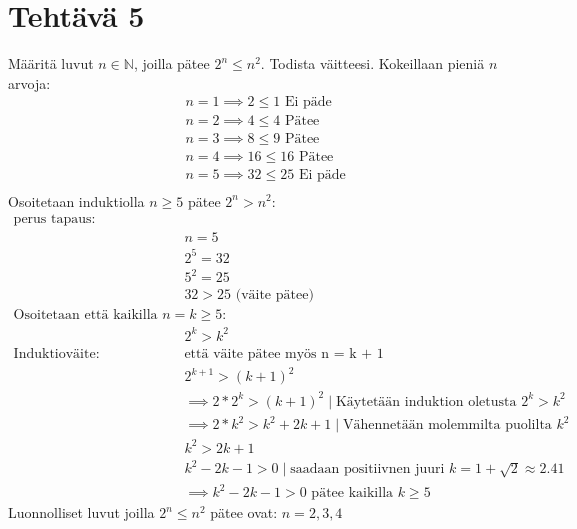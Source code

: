 \documentclass{article}
\begin{document}
	\section*{Tehtävä 5}
    Määritä luvut $n \in \mathbb{N}$, joilla pätee $2^n \leq n^2$. Todista väitteesi.
    \newline
    \newline
    Kokeillaan pieniä $n$ arvoja:
    \[
        \begin{aligned}
            &n = 1 \implies 2 \leq 1 \text{ Ei päde}\\
            &n = 2 \implies 4 \leq 4 \text{ Pätee}\\
            &n = 3 \implies 8 \leq 9 \text{ Pätee}\\
            &n = 4 \implies 16 \leq 16 \text{ Pätee}\\
            &n = 5 \implies 32 \leq 25 \text{ Ei päde}\\
        \end{aligned}
    \]
    Osoitetaan induktiolla $n \geq 5$ pätee $2^n > n^2  $:
    \[
        \begin{aligned}
            \text{perus tapaus:}&\\
            &n = 5\\
            &2^5 = 32\\
            &5^2 = 25\\
            &32 > 25 \text{ (väite pätee)}\\[10pt]
            \text{Osoitetaan että kaikilla $n = k \geq 5$:}&\\
            &2^k > k^2\\
            \text{Induktioväite: Todistetaan, } & \text{että väite pätee myös n = k + 1}\\
            &2^{k+1} > (k+1)^2\\
            &\implies 2 * 2^k > (k + 1)^2 \mid \text{Käytetään induktion oletusta } 2^k > k^2\\
            &\implies 2 * k^2 > k^2 + 2k + 1 \mid \text{Vähennetään molemmilta puolilta } k^2\\
            &k^2 > 2k + 1\\
            &k^2 - 2k - 1 > 0 \mid \text{saadaan positiivnen juuri } k = 1 + \sqrt{2} \approx 2.41\\
            &\implies k^2 - 2k - 1 > 0 \text{ pätee kaikilla }k \geq 5 
        \end{aligned}
    \]
    Luonnolliset luvut joilla  $2^n \leq n^2$ pätee ovat:
    \newline
    $n = 2, 3, 4$
\end{document}
